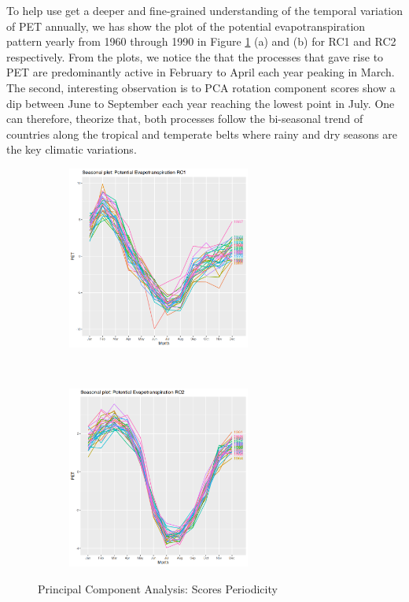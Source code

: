 \documentclass[12pt,a4paper]{article}
\begin{document}
To help use get a deeper and fine-grained understanding of the temporal variation of PET annually, we has show the plot of the potential evapotranspiration pattern yearly from 1960 through 1990 in Figure \ref{fig:periodicity} (a) and (b) for RC1 and RC2 respectively. From the plots,  we notice the that the processes that gave rise to PET are predominantly active in February to April each year peaking in March.  The second,  interesting observation is to PCA rotation component scores show a dip between June to September each year reaching the lowest point in July.  One can therefore,  theorize that, both processes follow the bi-seasonal trend of countries along the tropical and temperate belts where rainy and dry seasons are the key climatic variations.
\begin{figure}[!h]
    \centering
    \begin{subfigure}[t]{0.5\textwidth}
        \centering
        \includegraphics[width=\textwidth,height=170pt]{./gaphics/q003_d.png}
        \caption{}
    \end{subfigure}%
    ~ 
    \begin{subfigure}[t]{0.5\textwidth}
        \centering
        \includegraphics[width=\textwidth,height=170pt]{./gaphics/q003_e.png}
        \caption{}
    \end{subfigure}
    \caption{Principal Component Analysis: Scores Periodicity}
    \label{fig:periodicity}
\end{figure}
\end{document}
